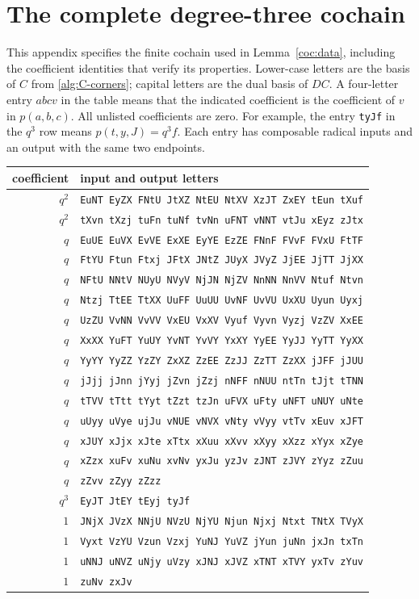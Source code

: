 \section{The complete degree-three cochain}
\label{app:cochain}

This appendix specifies the finite cochain used in
Lemma~\ref{coc:data}, including the coefficient identities that verify
its properties.  Lower-case letters are the basis of $C$ from
\eqref{alg:C-corners}; capital letters are the dual basis of $DC$.
A four-letter entry $abcv$ in the table means that the indicated
coefficient is the coefficient of $v$ in $p(a,b,c)$.  All unlisted
coefficients are zero.  For example, the entry \texttt{tyJf} in the
$q^3$ row means $p(t,y,J)=q^3f$.
Each entry has composable radical inputs
and an output with the same two endpoints.

\begin{center}
\small
\begin{tabular}{r@{\quad}l}
 coefficient & input and output letters \\ \hline
 $q^2$ & \texttt{EuNT EyZX FNtU JtXZ NtEU NtXV XzJT ZxEY tEun tXuf} \\
 $q^2$ & \texttt{tXvn tXzj tuFn tuNf tvNn uFNT vNNT vtJu xEyz zJtx} \\
 $q$ & \texttt{EuUE EuVX EvVE ExXE EyYE EzZE FNnF FVvF FVxU FtTF} \\
 $q$ & \texttt{FtYU Ftun Ftxj JFtX JNtZ JUyX JVyZ JjEE JjTT JjXX} \\
 $q$ & \texttt{NFtU NNtV NUyU NVyV NjJN NjZV NnNN NnVV Ntuf Ntvn} \\
 $q$ & \texttt{Ntzj TtEE TtXX UuFF UuUU UvNF UvVU UxXU Uyun Uyxj} \\
 $q$ & \texttt{UzZU VvNN VvVV VxEU VxXV Vyuf Vyvn Vyzj VzZV XxEE} \\
 $q$ & \texttt{XxXX YuFT YuUY YvNT YvVY YxXY YyEE YyJJ YyTT YyXX} \\
 $q$ & \texttt{YyYY YyZZ YzZY ZxXZ ZzEE ZzJJ ZzTT ZzXX jJFF jJUU} \\
 $q$ & \texttt{jJjj jJnn jYyj jZvn jZzj nNFF nNUU ntTn tJjt tTNN} \\
 $q$ & \texttt{tTVV tTtt tYyt tZzt tzJn uFVX uFty uNFT uNUY uNte} \\
 $q$ & \texttt{uUyy uVye ujJu vNUE vNVX vNty vVyy vtTv xEuv xJFT} \\
 $q$ & \texttt{xJUY xJjx xJte xTtx xXuu xXvv xXyy xXzz xYyx xZye} \\
 $q$ & \texttt{xZzx xuFv xuNu xvNv yxJu yzJv zJNT zJVY zYyz zZuu} \\
 $q$ & \texttt{zZvv zZyy zZzz} \\
 $q^3$ & \texttt{EyJT JtEY tEyj tyJf} \\
 $1$ & \texttt{JNjX JVzX NNjU NVzU NjYU Njun Njxj Ntxt TNtX TVyX} \\
 $1$ & \texttt{Vyxt VzYU Vzun Vzxj YuNJ YuVZ jYun juNn jxJn txTn} \\
 $1$ & \texttt{uNNJ uNVZ uNjy uVzy xJNJ xJVZ xTNT xTVY yxTv zYuv} \\
 $1$ & \texttt{zuNv zxJv} \\

\end{tabular}
\end{center}

